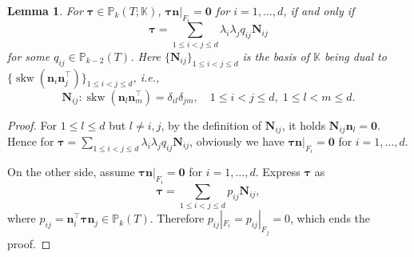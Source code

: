 \documentclass[10pt]{amsart}
\newtheorem{lemma}[theorem]{Lemma}
\newcommand{\skw}{\operatorname{skw}}
\numberwithin{equation}{section}
\begin{document}
\begin{lemma}\label{lem:PkKbubblecharac}
For $\boldsymbol{\tau}\in\mathbb P_k(T;\mathbb K)$, $\boldsymbol{\tau}\boldsymbol{n}|_{F_i}=\boldsymbol{0}$ for $i=1,\ldots, d$, if and only if 
\begin{equation}\label{eq:PkKbubblecharac}
\boldsymbol{\tau}=\sum_{1\leq i<j\leq d}\lambda_i\lambda_jq_{ij}\boldsymbol{N}_{ij}
\end{equation}
for some $q_{ij}\in\mathbb P_{k-2}(T)$. Here $\{\boldsymbol{N}_{ij}\}_{1\leq i<j\leq d}$ is the basis of $\mathbb K$ being dual to $\{\skw({\boldsymbol n_i\boldsymbol n_j^{\intercal}})\}_{1\leq i<j\leq d}$, i.e.,
$$
\boldsymbol{N}_{ij}:\skw({\boldsymbol n_l\boldsymbol n_m^{\intercal}})=\delta_{il}\delta_{jm},\quad 1\leq i<j\leq d,\; 1\leq l<m\leq d.
$$
\end{lemma}
\begin{proof}
For $1\leq l\leq d$ but $l\neq i, j$, by the definition of $\boldsymbol{N}_{ij}$, it holds $\boldsymbol{N}_{ij}\boldsymbol{n}_l=\boldsymbol{0}$. Hence for $
\boldsymbol{\tau}=\sum\limits_{1\leq i<j\leq d}\lambda_i\lambda_jq_{ij}\boldsymbol{N}_{ij}
$, obviously we have $\boldsymbol{\tau}\boldsymbol{n}|_{F_i}=\boldsymbol{0}$ for $i=1,\ldots, d$.

On the other side, assume $\boldsymbol{\tau}\boldsymbol{n}|_{F_i}=\boldsymbol{0}$ for $i=1,\ldots, d$. Express $\boldsymbol{\tau}$ as 
$$
\boldsymbol{\tau}=\sum_{1\leq i<j\leq d}p_{ij}\boldsymbol{N}_{ij},
$$
where $p_{ij}=\boldsymbol{n}_i^{\intercal}\boldsymbol{\tau}\boldsymbol{n}_j\in\mathbb P_{k}(T)$.
Therefore $p_{ij}|_{F_i}=p_{ij}|_{F_j}=0$, which ends the proof.
\end{proof}
\end{document}
